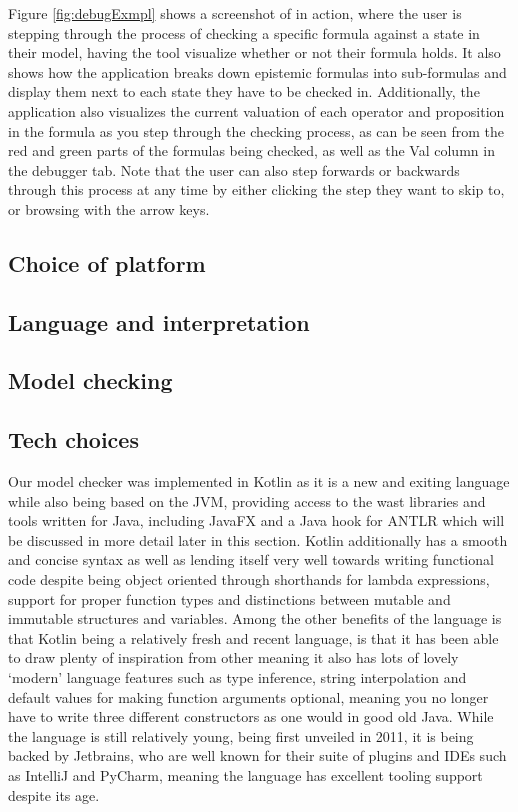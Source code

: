 Figure \ref{fig:debugExmpl} shows a screenshot of \cname in action, where the user is stepping through the process of checking a specific formula against a state in their model, having the tool visualize whether or not their formula holds. It also shows how the application breaks down epistemic formulas into sub-formulas and display them next to each state they have to be checked in. Additionally, the application also visualizes the current valuation of each operator and proposition in the formula as you step through the checking process, as can be seen from the red and green parts of the formulas being checked, as well as the Val column in the debugger tab. Note that the user can also step forwards or backwards through this process at any time by either clicking the step they want to skip to, or browsing with the arrow keys. 


\subsection{Choice of platform}

\subsection{Language and interpretation}

\subsection{Model checking}


\subsection{Tech choices}

Our model checker was implemented in Kotlin as it is a new and exiting language while also being based on the JVM, providing access to the wast libraries and tools written for Java, including JavaFX and a Java hook for ANTLR which will be discussed in more detail later in this section. Kotlin additionally has a smooth and concise syntax as well as lending itself very well towards writing functional code despite being object oriented through shorthands for lambda expressions, support for proper function types and distinctions between mutable and immutable structures and variables. Among the other benefits of the language is that Kotlin being a relatively fresh and recent language, is that it has been able to draw plenty of inspiration from other  meaning it also has lots of lovely `modern' language features such as type inference, string interpolation and default values for making function arguments optional, meaning you no longer have to write three different constructors as one would in good old Java. While the language is still relatively young, being first unveiled in 2011\cite{KotlinHello}, it is being backed by Jetbrains, who are well known for their suite of plugins and IDEs such as IntelliJ and PyCharm, meaning the language has excellent tooling support despite its age.

